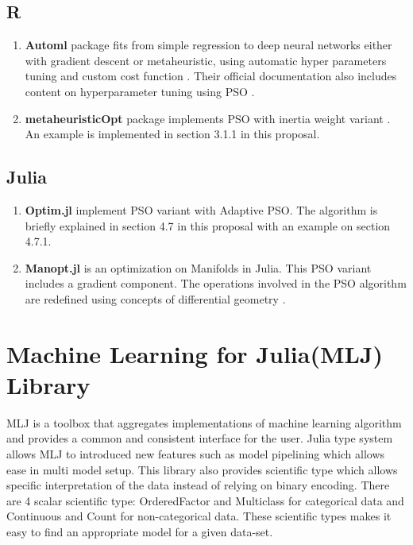 \documentclass{article}
\begin{document}
\subsection{R}
\begin{enumerate}
    \item \textbf{Automl} package fits from simple regression to  deep neural networks either with gradient descent or metaheuristic, using automatic hyper parameters tuning and custom cost function \cite{automl}. Their official documentation also includes content on hyperparameter tuning using PSO \cite{automlpso}.
    \item \textbf{metaheuristicOpt} package implements PSO with inertia weight variant \cite{metaheuristicOpt}. An example is implemented in section 3.1.1  in this proposal.
\end{enumerate}

\subsection{Julia}
\begin{enumerate}
    \item \textbf{Optim.jl} implement PSO variant with Adaptive PSO. The algorithm is briefly explained in section 4.7 in this proposal with an example on section 4.7.1.
    \item \textbf{Manopt.jl} is an optimization on Manifolds in Julia. This PSO variant includes a gradient component. The operations involved in the PSO algorithm are redefined using concepts of differential geometry \cite{10.1007/978-3-642-15461-4_2}.
\end{enumerate}

\section{Machine Learning for Julia(MLJ) Library}
MLJ is a toolbox that aggregates implementations of machine learning algorithm and provides a common and consistent interface for the user. Julia type system allows MLJ to introduced new features such as model pipelining which allows ease in multi model setup. This library also provides scientific type which allows specific interpretation of the data instead of relying on binary encoding. There are 4 scalar scientific type: OrderedFactor and Multiclass for categorical data and Continuous and Count for non-categorical data. These scientific types makes it easy to find an appropriate model for a given data-set.
\end{document}
